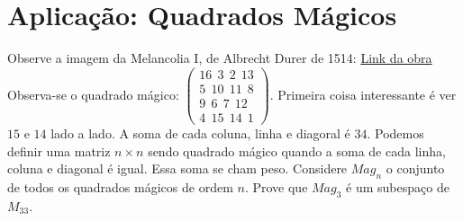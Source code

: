 \documentclass[12pt,letterpaper]{article}
\begin{document}
\section*{Aplicação: Quadrados Mágicos}

Observe a imagem da Melancolia I, de Albrecht Durer de 1514:
\href{https://artsandculture.google.com/asset/melencolia-i-albrecht-d%C3%BCrer/aAGgEK-AKbn5eQ?hl=zh-tw&ms=%7B%22x%22%3A0.7518538853310617%2C%22y%22%3A0.2894316595268001%2C%22z%22%3A10%2C%22size%22%3A%7B%22width%22%3A0.4646606018194542%2C%22height%22%3A0.355444997236042%7D%7D}{Link da obra}
Observa-se o quadrado mágico: 
$\begin{pmatrix}16~~3~~2~~13\\5~~10~~11~~8\\9~~6~~7~~12\\4~~15~~14~~1\end{pmatrix}$. Primeira coisa interessante é ver $15$ e $14$ lado a lado. A soma de cada coluna, linha e diagoral é $34$. Podemos definir uma matriz $n\times n$ sendo quadrado mágico quando a soma de cada linha, coluna e diagonal é igual. Essa soma se cham peso. Considere $Mag_n$ o conjunto de todos os quadrados mágicos de ordem $n$. Prove que $Mag_3$ é um subespaço de $M_{33}$. 
\end{document}
